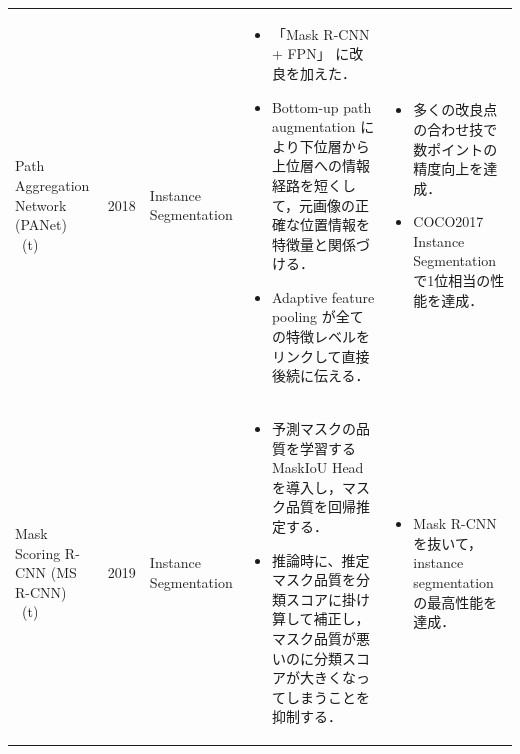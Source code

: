 \documentclass[twocolumn]{jsarticle} %
\begin{document}
\begin{table}
\begin{center}
\begin{tabularx}{\linewidth}{XcXp{7cm}X}
            Path Aggregation Network (PANet) \cite{LQQSJ18} \ (t) & 2018 & Instance Segmentation & 
            \begin{itemize}
                \vspace{-0.7\baselineskip}
                \setlength{\leftskip}{-3mm}
                \item 「Mask R-CNN + FPN」 に改良を加えた．
                \item Bottom-up path augmentation により下位層から上位層への情報経路を短くして，元画像の正確な位置情報を特徴量と関係づける．
                \item Adaptive feature pooling が全ての特徴レベルをリンクして直接後続に伝える．
            \end{itemize}
            &
            \begin{itemize}
                \vspace{-0.7\baselineskip}
                \setlength{\leftskip}{-3mm}
                \item  多くの改良点の合わせ技で数ポイントの精度向上を達成．
                \item COCO2017 Instance Segmentationで1位相当の性能を達成．
            \end{itemize}
            \\

            Mask Scoring R-CNN (MS R-CNN) \cite{HHGHW19} \ (t) & 2019 & Instance Segmentation & 
            \begin{itemize}
                \vspace{-0.7\baselineskip}
                \setlength{\leftskip}{-3mm}
                \item 予測マスクの品質を学習する MaskIoU Head を導入し，マスク品質を回帰推定する．
                \item 推論時に、推定マスク品質を分類スコアに掛け算して補正し，マスク品質が悪いのに分類スコアが大きくなってしまうことを抑制する．
            \end{itemize}
            &
            \begin{itemize}
                \vspace{-0.7\baselineskip}
                \setlength{\leftskip}{-3mm}
                \item Mask R-CNN を抜いて，instance segmentation の最高性能を達成．
            \end{itemize}
            \\


\end{tabularx}
\end{center}
\end{table}
\end{document}
